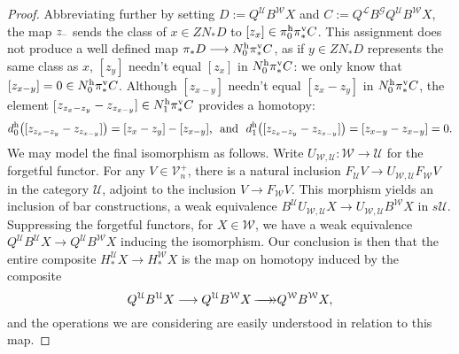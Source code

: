 \documentclass[11pt]{amsart}
\theoremstyle{plain}
\theoremstyle{definition}
\newcommand{\DASH}{\textup{--}}
\renewcommand{\to}{\longrightarrow}
\newcommand{\scrG}{\mathscr{G}}
\newcommand{\calW}{\mathcal{W}}
\newcommand{\calU}{\mathcal{U}}
\newcommand{\calL}{\mathcal{L}}
\newcommand{\calV}{\mathcal{V}}
\theoremstyle{plain}
\newcommand{\vect}[2]{\calV^{#1}_{#2}}
\newcommand{\BSW}{{\scrG}}
\newcommand{\epi}{{\,\makebox[0cm][l]{\ensuremath\to}\to}}
\begin{document}
\begin{Composite functor spectral sequences}
\begin{proof}
Abbreviating further by setting $D:=Q^{\calU}B^{\calW}X$ and $C:=Q^{\calL}B^{\BSW} Q^{\calU}B^{\calW}X$, the map $z_{\DASH}$ sends the class of $x\in ZN_*D$ to $[z_x]\in \pi_0^\textup{h}\pi^\textup{v}_*C$. This assignment does not produce a well defined map $\pi_*D\to N^\textup{h}_0\pi^\textup{v}_*C$, as if $y\in ZN_* D$ represents the same class as $x$, $[z_y]$ needn't equal $[z_x]$ in $N^\textup{h}_0\pi^\textup{v}_*C$: we only know that $[z_{x-y}]=0\in N_0^\textup{h}\pi_*^\textup{v}C$.
Although $[z_{x-y}]$ needn't equal $[z_{x}-z_{y}]$ in $N_0^\textup{h}\pi_*^\textup{v}C$, the element [$z_{z_{x}-z_{y}}-z_{z_{x-y}}]\in N_1^\textup{h}\pi_*^\textup{v}C$ provides a homotopy:
%
\[d_0^\textup{h}\!\left([z_{z_{x}-z_{y}}-z_{z_{x-y}}]\right)=[z_x-z_y]-[z_{x-y}]\textup{, \  and \ }d_1^\textup{h}\!\left([z_{z_{x}-z_{y}}-z_{z_{x-y}}]\right)=[z_{{x}-{y}}-z_{{x}-{y}}]=0.\]
We may model the final isomorphism as follows. Write $U_{\calW,\calU}:\calW\to\calU$ for the forgetful functor. For any $V\in\vect{+}{n}$, there is a natural inclusion $F_{\calU}V\to U_{\calW,\calU} F_{\calW}V$ in the category  $\calU$, adjoint to the inclusion $V\to F_{\calW}V$. This morphism yields an inclusion of bar constructions, a weak equivalence $B^{\calU}U_{\calW,\calU}X\to U_{\calW,\calU}B^{\calW}X$ in $s\calU$. Suppressing the forgetful functors, for $X\in\calW$, we have a weak equivalence $Q^{\calU}B^{\calU}X\to Q^{\calU}B^{\calW}X$ inducing the isomorphism. Our conclusion is then that the entire composite $H_*^{\calU}X\to H_*^{\calW}X$ is the map on homotopy induced by the composite 
\[Q^{\calU}B^{\calU}X\to Q^{\calU}B^{\calW}X \epi Q^{\calW}B^{\calW}X,\]
and the operations we are considering are easily understood in relation to this map.
\end{proof}


\end{Composite functor spectral sequences}
\end{document}
